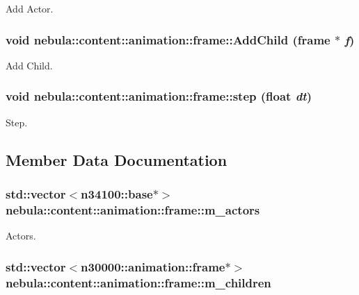 Add Actor. \hypertarget{classnebula_1_1content_1_1animation_1_1frame_a96a713d46481edd00c33476da794b6f1}{
\subsubsection[{AddChild}]{\setlength{\rightskip}{0pt plus 5cm}void nebula::content::animation::frame::AddChild ({\bf frame} $\ast$ {\em f})}}
\label{classnebula_1_1content_1_1animation_1_1frame_a96a713d46481edd00c33476da794b6f1}


Add Child. \hypertarget{classnebula_1_1content_1_1animation_1_1frame_a01b8c1866c9fdfdf8006e4c9341afc7a}{
\subsubsection[{step}]{\setlength{\rightskip}{0pt plus 5cm}void nebula::content::animation::frame::step (float {\em dt})}}
\label{classnebula_1_1content_1_1animation_1_1frame_a01b8c1866c9fdfdf8006e4c9341afc7a}


Step. 

\subsection{Member Data Documentation}
\hypertarget{classnebula_1_1content_1_1animation_1_1frame_adf0741bb9645a0fe8d90d2e57c0e96df}{
\subsubsection[{m\_\-actors}]{\setlength{\rightskip}{0pt plus 5cm}std::vector$<${\bf n34100::base}$\ast$$>$ {\bf nebula::content::animation::frame::m\_\-actors}}}
\label{classnebula_1_1content_1_1animation_1_1frame_adf0741bb9645a0fe8d90d2e57c0e96df}


Actors. \hypertarget{classnebula_1_1content_1_1animation_1_1frame_ad3574adbcc373211213b6f0adec6c1c6}{
\subsubsection[{m\_\-children}]{\setlength{\rightskip}{0pt plus 5cm}std::vector$<${\bf n30000::animation::frame}$\ast$$>$ {\bf nebula::content::animation::frame::m\_\-children}}}
\label{classnebula_1_1content_1_1animation_1_1frame_ad3574adbcc373211213b6f0adec6c1c6}


